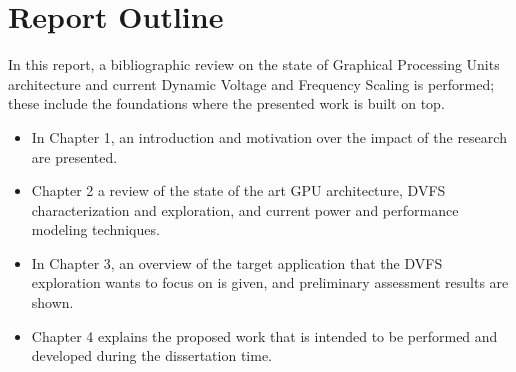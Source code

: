 \section{Report Outline}

In this report, a bibliographic review on the state of Graphical Processing Units architecture and current Dynamic Voltage and Frequency Scaling is performed; these include the foundations where the presented work is built on top. 

\begin{itemize}
\item In Chapter 1, an introduction and motivation over the impact of the research are presented.
\item Chapter 2 a review of the state of the art GPU architecture, DVFS characterization and exploration, and current power and performance modeling techniques.
\item In Chapter 3, an overview of the target application that the DVFS exploration wants to focus on is given, and preliminary assessment results are shown.
\item Chapter 4 explains the proposed work that is intended to be performed and developed during the dissertation time.

\end{itemize}